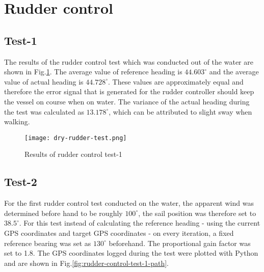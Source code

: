 \section{Rudder control}
\subsection{Test-1}
\label{rudder-test-1}

The results of the rudder control test which was conducted out of the water are shown in Fig.\ref{fig:rudder-control-dry}. The average value of reference heading is $44.603^{\circ}$ and the average value of actual 
heading is $44.728^{\circ}$. These values are approximately equal and therefore the error signal that is generated for the rudder controller should keep the vessel on course when on water. The variance of the 
actual heading during the test was calculated as $13.178^{\circ}$, which can be attributed to slight sway when walking.  

\begin{figure}[h!]
    \centering
    \texttt{[image: dry-rudder-test.png]}
    \caption[Rudder control test-1]{Results of rudder control test-1}
    \label{fig:rudder-control-dry}
\end{figure}


\subsection{Test-2}
\label{rudder-test-2}

For the first rudder control test conducted on the water, the apparent wind was determined before hand to be roughly $100^{\circ}$, the sail position was therefore set to $38.5^{\circ}$.%
For this test instead of calculating the reference heading - using the current GPS coordinates and target GPS coordinates - on every iteration, a fixed reference bearing was set as $130^{\circ}$ 
beforehand. The proportional gain factor was set to 1.8. The GPS coordinates logged during the test were plotted with Python and are shown in Fig.\ref{fig:rudder-control-test-1-path}. 

